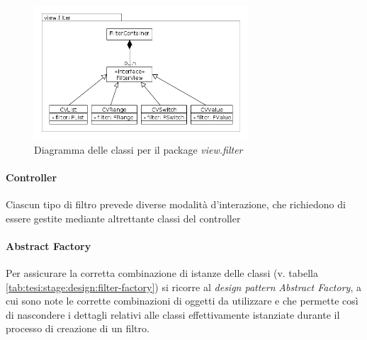 \begin{figure}[ht]
\begin{center}
	\includegraphics[width=8cm]{img/view_filter.png}
	\caption{Diagramma delle classi per il package \textit{view.filter}}
	\label{fig:tesi:stage:design:view-filter-classi}
\end{center}
\end{figure}

\paragraph{Controller}
Ciascun tipo di filtro prevede diverse modalità d'interazione, che richiedono di essere gestite mediante altrettante classi del \textsf{controller}

\paragraph{Abstract Factory}
Per assicurare la corretta combinazione di istanze delle classi (v. tabella \ref{tab:tesi:stage:design:filter-factory}) si ricorre al \textit{design pattern} \textit{Abstract Factory}, a cui sono note le corrette combinazioni di oggetti da utilizzare e che permette così di nascondere i dettagli relativi alle classi effettivamente istanziate durante il processo di creazione di un filtro.

